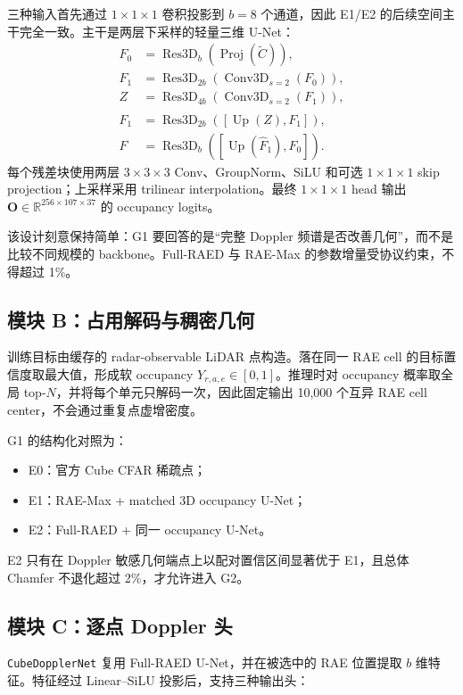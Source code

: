 \documentclass[11pt,a4paper,fontset=none]{ctexart}
\newcommand{\code}[1]{\texttt{#1}}
\begin{document}
三种输入首先通过 $1\times1\times1$ 卷积投影到 $b=8$ 个通道，因此 E1/E2 的后续空间主干完全一致。主干是两层下采样的轻量三维 U-Net：
\begin{align}
  F_0 &= \operatorname{Res3D}_{b}(\operatorname{Proj}(\widetilde C)),\\
  F_1 &= \operatorname{Res3D}_{2b}(\operatorname{Conv3D}_{s=2}(F_0)),\\
  Z &= \operatorname{Res3D}_{4b}(\operatorname{Conv3D}_{s=2}(F_1)),\\
  \widehat F_1 &= \operatorname{Res3D}_{2b}([\operatorname{Up}(Z),F_1]),\\
  F &= \operatorname{Res3D}_{b}([\operatorname{Up}(\widehat F_1),F_0]).
\end{align}
每个残差块使用两层 $3\times3\times3$ Conv、GroupNorm、SiLU 和可选 $1\times1\times1$ skip projection；上采样采用 trilinear interpolation。最终 $1\times1\times1$ head 输出
$\mathbf{O}\in\mathbb{R}^{256\times107\times37}$ 的 occupancy logits。

该设计刻意保持简单：G1 要回答的是“完整 Doppler 频谱是否改善几何”，而不是比较不同规模的 backbone。Full-RAED 与 RAE-Max 的参数增量受协议约束，不得超过 1\%。

\subsection{模块 B：占用解码与稠密几何}

训练目标由缓存的 radar-observable LiDAR 点构造。落在同一 RAE cell 的目标置信度取最大值，形成软 occupancy $Y_{r,a,e}\in[0,1]$。推理时对 occupancy 概率取全局 top-$N$，并将每个单元只解码一次，因此固定输出 10,000 个互异 RAE cell center，不会通过重复点虚增密度。

G1 的结构化对照为：
\begin{itemize}
  \item E0：官方 Cube CFAR 稀疏点；
  \item E1：RAE-Max + matched 3D occupancy U-Net；
  \item E2：Full-RAED + 同一 occupancy U-Net。
\end{itemize}
E2 只有在 Doppler 敏感几何端点上以配对置信区间显著优于 E1，且总体 Chamfer 不退化超过 2\%，才允许进入 G2。

\subsection{模块 C：逐点 Doppler 头}

\code{CubeDopplerNet} 复用 Full-RAED U-Net，并在被选中的 RAE 位置提取 $b$ 维特征。特征经过 Linear--SiLU 投影后，支持三种输出头：
\end{document}

